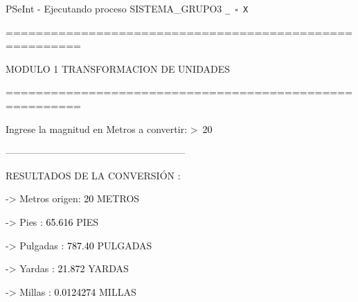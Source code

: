 \documentclass[12pt,a4paper]{article}
\newcommand{\consola}[1]{\noindent\textcolor{pseString}{#1}}
\newcommand{\entrada}[1]{\textcolor{black}{#1}}
\newenvironment{PSeIntWindow}{%
	\begin{tcolorbox}[
		breakable,
		enhanced,
		colback=white,
		colframe=black!60,
		boxrule=0.5pt,
		arc=1mm,
		left=0mm,
		right=0mm,
		top=0mm,
		bottom=2mm,
		width=\textwidth
		]
	}{%
	\end{tcolorbox}
}
\newcommand{\BarraPSeInt}{%
	\colorbox{gray!20}{%
		\parbox{\dimexpr\textwidth-2\fboxsep\relax}{%
			\small
			\textcolor{pseString}{\faPlayCircle}
			\hspace{0.3em}
			PSeInt - Ejecutando proceso SISTEMA\_GRUPO3
			\hfill
			\texttt{\_ \hspace{0.5em} \(\square\) \hspace{0.5em} X}
		}
	}
}
\begin{document}
\begin{PSeIntWindow}
	
	\BarraPSeInt
	
	\vspace{0.2cm}
	
	\ttfamily
	\small
	
	\consola{========================================================}\par
	
	\begin{center}
		\textcolor{pseString}{MODULO 1 \hspace{1cm} TRANSFORMACION DE UNIDADES}
	\end{center}
	
	\consola{========================================================}\par
	
	\vspace{0.4cm}
	
	\consola{Ingrese la magnitud en Metros a convertir: \textgreater\ }\entrada{20}\par
	
	\vspace{0.4cm}
	
	\consola{--------------------------------------------------------}\par
	
	\vspace{0.2cm}
	
	\consola{RESULTADOS DE LA CONVERSIÓN :}\par
	
	\vspace{0.2cm}
	
	\consola{\hspace*{0.5cm}-> Metros origen: }\entrada{20}\consola{ METROS}\par
	
	\consola{\hspace*{0.5cm}-> Pies : }\entrada{65.616}\consola{ PIES}\par
	
	\consola{\hspace*{0.5cm}-> Pulgadas : }\entrada{787.40}\consola{ PULGADAS}\par
	
	\consola{\hspace*{0.5cm}-> Yardas : }\entrada{21.872}\consola{ YARDAS}\par
	
	\consola{\hspace*{0.5cm}-> Millas : }\entrada{0.0124274}\consola{ MILLAS}\par
	

\end{PSeIntWindow}
\end{document}
